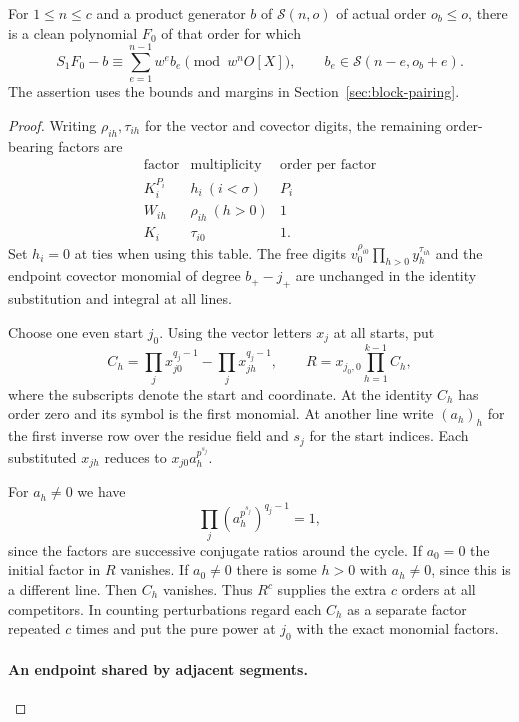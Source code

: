 \begin{lemma}
\label{lem:raw-tail-correction}
For \(1\le n\le c\) and a product generator \(b\) of
\(\mathcal S(n,o)\) of actual order \(o_b\le o\), there is a clean
polynomial \(F_0\) of that order for which
\[
 S_1 F_0-b\equiv\sum_{e=1}^{n-1}w^e b_e\pmod{w^nO[X]},
 \qquad b_e\in\mathcal S(n-e,o_b+e).
\]
The assertion uses the bounds and margins in
Section~\ref{sec:block-pairing}.
\end{lemma}

\begin{proof}
Writing \(\rho_{ih},\tau_{ih}\) for the vector and covector
digits, the remaining order-bearing factors are
\[
\begin{array}{c|c|c}
 \text{factor}&\text{multiplicity}&\text{order per factor}\\ \hline
 K_i^{P_i}&h_i\ (i<\sigma)&P_i\\
 W_{ih}&\rho_{ih}\ (h>0)&1\\
 K_i&\tau_{i0}&1 .
\end{array}
\]
Set \(h_i=0\) at ties when using this table.
The free digits \(v_0^{\rho_{i0}}\prod_{h>0}y_h^{\tau_{ih}}\)
and the endpoint covector monomial of degree \(b_+-j_+\) are
unchanged in the identity substitution and integral at all lines.

Choose one even start \(j_0\). Using the vector letters \(x_j\)
at all starts, put
\[
 C_h=\prod_j x_{j0}^{q_j-1}-\prod_j x_{jh}^{q_j-1},
 \qquad R=x_{j_0,0}\prod_{h=1}^{k-1} C_h ,
\]
where the subscripts denote the start and coordinate.
At the identity \(C_h\) has order zero and its symbol is the
first monomial. At another line write \((a_h)_h\) for the first
inverse row over the residue field and \(s_j\) for the start indices.
Each substituted \(x_{jh}\) reduces to \(x_{j0}a_h^{p^{s_j}}\).

For \(a_h\ne0\) we have
\[
 \prod_j(a_h^{p^{s_j}})^{q_j-1}=1,
\]
since the factors are
successive conjugate ratios around the cycle. If \(a_0=0\)
the initial factor in \(R\) vanishes. If \(a_0\ne0\) there is
some \(h>0\) with \(a_h\ne0\), since this is a different line.
Then \(C_h\) vanishes. Thus \(R^c\) supplies the extra \(c\)
orders at all competitors. In counting perturbations regard
each \(C_h\) as a separate factor repeated \(c\) times and
put the pure power at \(j_0\) with the exact monomial factors.

\paragraph{An endpoint shared by adjacent segments.}


\end{proof}
